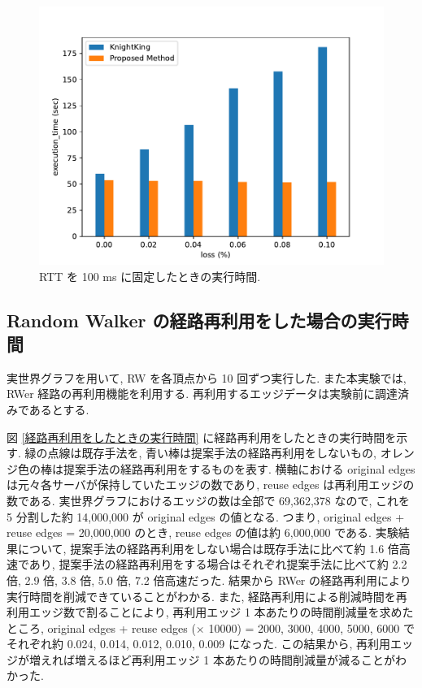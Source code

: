 \begin{figure}[t]
    \centering
    \includegraphics[scale=0.8]{figure/Kn_vs_AR_loss.pdf}
    \caption{RTT を 100 ms に固定したときの実行時間.}
    \label{RTT を 100 ms に固定したときの実行時間}
\end{figure}

\subsection{Random Walker の経路再利用をした場合の実行時間}\label{Random Walker の経路再利用をした場合の実行時間}

実世界グラフを用いて, RW を各頂点から 10 回ずつ実行した. また本実験では, RWer 経路の再利用機能を利用する. 再利用するエッジデータは実験前に調達済みであるとする. 

図 \ref{経路再利用をしたときの実行時間} に経路再利用をしたときの実行時間を示す. 緑の点線は既存手法を, 青い棒は提案手法の経路再利用をしないもの, オレンジ色の棒は提案手法の経路再利用をするものを表す. 横軸における original edges は元々各サーバが保持していたエッジの数であり, reuse edges は再利用エッジの数である. 実世界グラフにおけるエッジの数は全部で 69,362,378 なので, これを 5 分割した約 14,000,000 が original edges の値となる. つまり, original edges + reuse edges = 20,000,000 のとき, reuse edges の値は約 6,000,000 である. 実験結果について, 提案手法の経路再利用をしない場合は既存手法に比べて約 1.6 倍高速であり, 提案手法の経路再利用をする場合はそれぞれ提案手法に比べて約 2.2 倍, 2.9 倍, 3.8 倍, 5.0 倍, 7.2 倍高速だった. 結果から RWer の経路再利用により実行時間を削減できていることがわかる. また, 経路再利用による削減時間を再利用エッジ数で割ることにより, 再利用エッジ 1 本あたりの時間削減量を求めたところ, original edges + reuse edges ($\times$ 10000) = 2000, 3000, 4000, 5000, 6000 でそれぞれ約 0.024, 0.014, 0.012, 0.010, 0.009 になった. この結果から, 再利用エッジが増えれば増えるほど再利用エッジ 1 本あたりの時間削減量が減ることがわかった. 
\\
\\
\\

